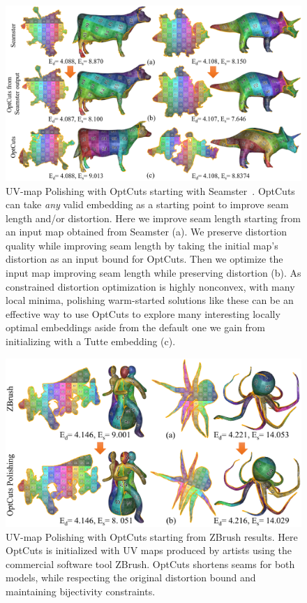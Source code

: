 \begin{figure}[t]
\centering
\includegraphics[width=\linewidth]{fig/comp_Seamster.png}
\vspace{-0.3cm}
\caption{UV-map Polishing with OptCuts starting with Seamster~\cite{Sheffer2002Seamster}. OptCuts can take \emph{any} valid embedding as a starting point to improve seam length and/or distortion. Here we improve seam length starting from an input map obtained from Seamster (a). We preserve distortion quality while improving seam length by taking the initial map's distortion as an input bound for OptCuts. Then we optimize the input map improving seam length while preserving distortion (b). As constrained distortion optimization is highly nonconvex, with many local minima, polishing warm-started solutions like these can be an effective way to use OptCuts to explore many interesting locally optimal embeddings aside from the default one we gain from initializing with a Tutte embedding (c).}
\vspace{-0.3cm}
\label{fig:comp_Seamster}
\end{figure}

\begin{figure}[t]
\centering
\includegraphics[width=\linewidth]{fig/polish_ZB.png}
\vspace{-0.3cm}
\caption{UV-map Polishing with OptCuts starting from ZBrush results. Here OptCuts is initialized with UV maps produced by artists using the commercial software tool ZBrush. OptCuts shortens seams for both models, while respecting the original distortion bound and maintaining bijectivity constraints.}
\vspace{-0.3cm}
\label{fig:polish_zbrush}
\end{figure}


